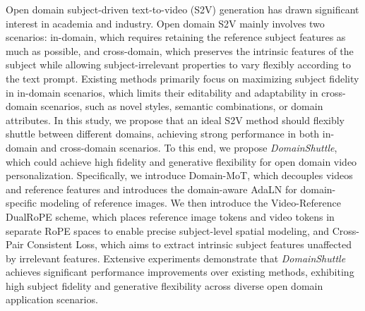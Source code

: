   Open domain subject-driven text-to-video (S2V) generation has drawn significant interest in academia and industry. Open domain S2V mainly involves two scenarios: in-domain, which requires retaining the reference subject features as much as possible, and cross-domain, which preserves the intrinsic features of the subject while allowing subject-irrelevant properties to vary flexibly according to the text prompt. Existing methods primarily focus on maximizing subject fidelity in in-domain scenarios, which limits their editability and adaptability in cross-domain scenarios, such as novel styles, semantic combinations, or domain attributes. In this study, we propose that an ideal S2V method should flexibly shuttle between different domains, achieving strong performance in both in-domain and cross-domain scenarios. To this end, we propose \textit{DomainShuttle}, which could achieve high fidelity and generative flexibility for open domain video personalization. Specifically, we introduce Domain-MoT, which decouples videos and reference features and introduces the domain-aware AdaLN for domain-specific modeling of reference images. We then introduce the Video-Reference DualRoPE scheme, which places reference image tokens and video tokens in separate RoPE spaces to enable precise subject-level spatial modeling, and Cross-Pair Consistent Loss, which aims to extract intrinsic subject features unaffected by irrelevant features. Extensive experiments demonstrate that \textit{DomainShuttle} achieves significant performance improvements over existing methods, exhibiting high subject fidelity and generative flexibility across diverse open domain application scenarios.